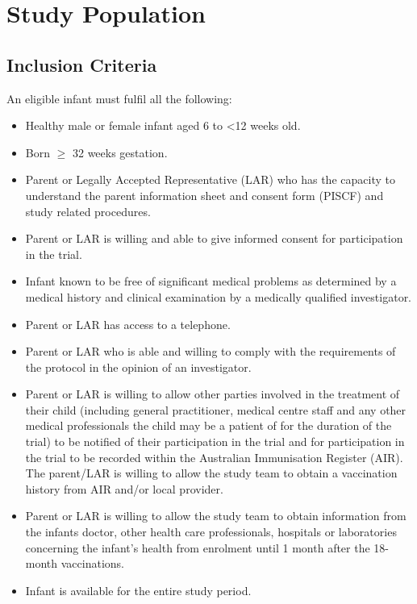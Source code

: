 \documentclass{bmcart}
\begin{document}
\section*{Study Population}

\subsection*{Inclusion Criteria}

An eligible infant must fulfil all the following:

\begin{itemize}
	\item Healthy male or female infant aged 6 to \textless12 weeks old.
	\item Born $\geq$ 32 weeks gestation.
	\item
	Parent or Legally Accepted Representative (LAR) who has the capacity to understand the parent information sheet and consent form (PISCF) and study related procedures.
	\item Parent or LAR is willing and able to give informed consent for participation in the trial.
	\item Infant known to be free of significant medical problems as determined by a medical history and clinical examination by a medically qualified investigator.
	\item Parent or LAR has access to a telephone.
	\item Parent or LAR who is able and willing to comply with the requirements of the protocol in the opinion of an investigator.
	\item Parent or LAR is willing to allow other parties involved in the treatment of their child (including general practitioner, medical centre staff and any other medical professionals the child may be a patient of for the duration of the trial) to be notified of their participation in the trial and for participation in the trial to be recorded within the Australian Immunisation Register (AIR). The parent/LAR is willing to allow the study team to obtain a vaccination history from AIR and/or local provider.
	\item Parent or LAR is willing to allow the study team to obtain information from the infants doctor, other health care professionals, hospitals or laboratories concerning the infant's health from enrolment until 1 month after the 18-month vaccinations.
	\item Infant is available for the entire study period.
\end{itemize}
\end{document}
